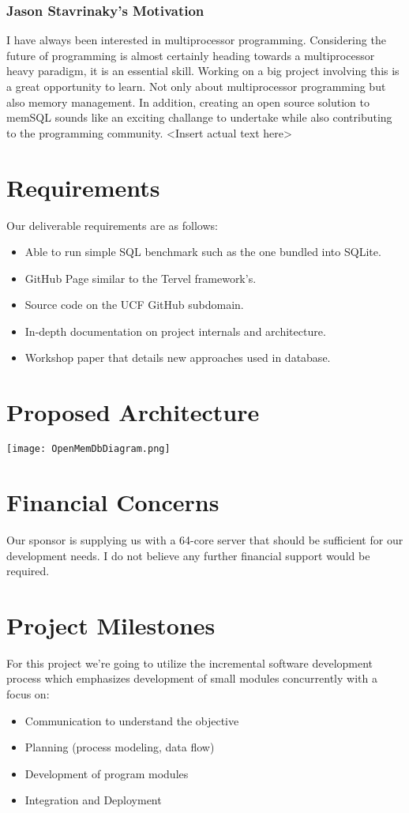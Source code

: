 \documentclass[letterpaper]{article}
\begin{document}
  \subsubsection{Jason Stavrinaky's Motivation}
  I have always been interested in multiprocessor programming. Considering the future of programming is almost certainly heading towards a
  multiprocessor heavy paradigm, it is an essential skill. Working on a big project involving this is a great opportunity to learn. Not only
  about multiprocessor programming but also memory management. In addition, creating an open source solution to memSQL sounds like an exciting
  challange to undertake while also contributing to the programming community.
  \textless Insert actual text here\textgreater
  
  \section{Requirements}
  Our deliverable requirements are as follows:
  \begin{itemize}
   \item Able to run simple SQL benchmark such as the one bundled into SQLite.
   \item GitHub Page similar to the Tervel framework's.
   \item Source code on the UCF GitHub subdomain.
   \item In-depth documentation on project internals and architecture.
   \item Workshop paper that details new approaches used in database.
  \end{itemize}
  
  \section{Proposed Architecture}
  \texttt{[image: OpenMemDbDiagram.png]}
  
  \section{Financial Concerns}
  Our sponsor is supplying us with a 64-core server that should be sufficient for our development needs. I do not believe any further financial
  support would be required.
  
  \section{Project Milestones}
  For this project we're going to utilize the incremental software development process which emphasizes development of small modules concurrently
  with a focus on:
  \begin{itemize}
   \item Communication to understand the objective
   \item Planning (process modeling, data flow)
   \item Development of program modules
   \item Integration and Deployment
  \end{itemize}
\end{document}

